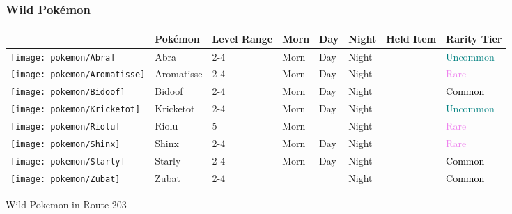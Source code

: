 \subsubsection{Wild Pokémon}%
\label{ssubsec:WildPokmon}%
\begin{longtable}{||l l l l l l l l||}%
\hline%
&Pokémon&Level Range&Morn&Day&Night&Held Item&Rarity Tier\\%
\hline%
\endhead%
\hline%
\texttt{[image: pokemon/Abra]}&Abra&2{-}4&Morn&Day&Night&&\textcolor{teal}{%
Uncommon%
}\\%
\hline%
\texttt{[image: pokemon/Aromatisse]}&Aromatisse&2{-}4&Morn&Day&Night&&\textcolor{violet}{%
Rare%
}\\%
\hline%
\texttt{[image: pokemon/Bidoof]}&Bidoof&2{-}4&Morn&Day&Night&&\textcolor{black}{%
Common%
}\\%
\hline%
\texttt{[image: pokemon/Kricketot]}&Kricketot&2{-}4&Morn&Day&Night&&\textcolor{teal}{%
Uncommon%
}\\%
\hline%
\texttt{[image: pokemon/Riolu]}&Riolu&5&Morn&&Night&&\textcolor{violet}{%
Rare%
}\\%
\hline%
\texttt{[image: pokemon/Shinx]}&Shinx&2{-}4&Morn&Day&Night&&\textcolor{violet}{%
Rare%
}\\%
\hline%
\texttt{[image: pokemon/Starly]}&Starly&2{-}4&Morn&Day&Night&&\textcolor{black}{%
Common%
}\\%
\hline%
\texttt{[image: pokemon/Zubat]}&Zubat&2{-}4&&&Night&&\textcolor{black}{%
Common%
}\\%
\hline%
\end{longtable}%
\caption{Wild Pokemon in Route 203}